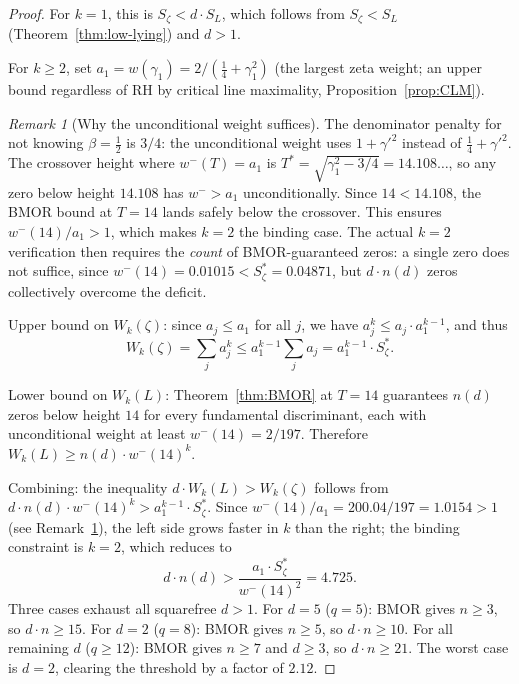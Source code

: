 \documentclass[12pt,reqno]{amsart}
\theoremstyle{plain}
\theoremstyle{definition}
\theoremstyle{remark}
\newtheorem{remark}[theorem]{Remark}
\newcommand{\half}{\tfrac{1}{2}}
\newcommand{\quarter}{\tfrac{1}{4}}
\begin{document}
\begin{proof}
For $k = 1$, this is $S_\zeta < d \cdot S_L$, which follows from $S_\zeta < S_L$ (Theorem~\ref{thm:low-lying}) and $d > 1$.

For $k \geq 2$, set $a_1 = w(\gamma_1) = 2/(\quarter + \gamma_1^2)$ (the largest zeta weight; an upper bound regardless of RH by critical line maximality, Proposition~\ref{prop:CLM}).

\begin{remark}[Why the unconditional weight suffices]\label{rem:unconditional-moment}
The denominator penalty for not knowing $\beta = \half$ is $3/4$: the unconditional weight uses $1 + \gamma'^2$ instead of $\quarter + \gamma'^2$.  The crossover height where $w^-(T) = a_1$ is $T^* = \sqrt{\gamma_1^2 - 3/4} = 14.108\ldots$, so any zero below height $14.108$ has $w^- > a_1$ unconditionally.  Since $14 < 14.108$, the BMOR bound at $T = 14$ lands safely below the crossover.  This ensures $w^-(14)/a_1 > 1$, which makes $k = 2$ the binding case.  The actual $k = 2$ verification then requires the \emph{count} of BMOR-guaranteed zeros: a single zero does not suffice, since $w^-(14) = 0.01015 < S_\zeta^* = 0.04871$, but $d \cdot n(d)$ zeros collectively overcome the deficit.
\end{remark}

Upper bound on $W_k(\zeta)$: since $a_j \leq a_1$ for all $j$, we have $a_j^k \leq a_j \cdot a_1^{k-1}$, and thus
\[
  W_k(\zeta) = \sum_j a_j^k \leq a_1^{k-1} \sum_j a_j = a_1^{k-1} \cdot S_\zeta^*.
\]

Lower bound on $W_k(L)$: Theorem~\ref{thm:BMOR} at $T = 14$ guarantees $n(d)$ zeros below height $14$ for every fundamental discriminant, each with unconditional weight at least $w^-(14) = 2/197$.  Therefore $W_k(L) \geq n(d) \cdot w^-(14)^k$.

Combining: the inequality $d \cdot W_k(L) > W_k(\zeta)$ follows from $d \cdot n(d) \cdot w^-(14)^k > a_1^{k-1} \cdot S_\zeta^*$.  Since $w^-(14)/a_1 = 200.04/197 = 1.0154 > 1$ (see Remark~\ref{rem:unconditional-moment}), the left side grows faster in $k$ than the right; the binding constraint is $k = 2$, which reduces to
\[
  d \cdot n(d) > \frac{a_1 \cdot S_\zeta^*}{w^-(14)^2} = 4.725.
\]
Three cases exhaust all squarefree $d > 1$.  For $d = 5$ ($q = 5$): BMOR gives $n \geq 3$, so $d \cdot n \geq 15$.  For $d = 2$ ($q = 8$): BMOR gives $n \geq 5$, so $d \cdot n \geq 10$.  For all remaining $d$ ($q \geq 12$): BMOR gives $n \geq 7$ and $d \geq 3$, so $d \cdot n \geq 21$.  The worst case is $d = 2$, clearing the threshold by a factor of $2.12$.
\end{proof}
\end{document}
